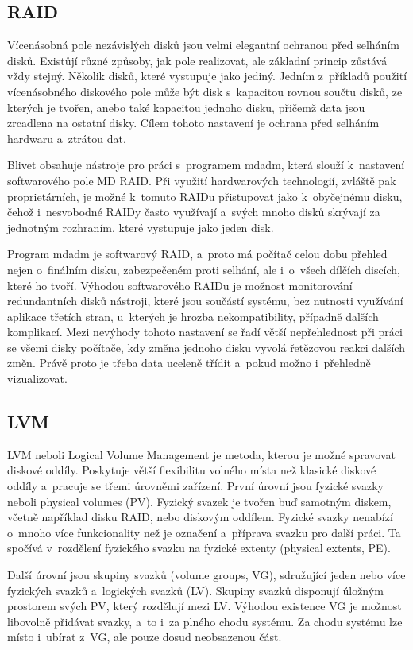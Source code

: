 \documentclass[color,table,oneside,nolot,nolof]{fithesis}
\begin{document}
\subsection{RAID}
	Vícenásobná pole nezávislých disků jsou velmi elegantní ochranou před selháním disků. Existůjí různé způsoby, jak pole realizovat, ale základní princip zůstává vždy stejný. 
	Několik disků, které vystupuje jako jediný\cite{RAID}. Jedním z~příkladů použití vícenásobného diskového pole může být disk s~kapacitou rovnou součtu disků, ze kterých je tvořen, anebo také
	kapacitou jednoho disku, přičemž data jsou zrcadlena na ostatní disky. Cílem tohoto nastavení je ochrana před selháním hardwaru a~ztrátou dat. 
	
	Blivet obsahuje nástroje pro práci s~programem mdadm, která slouží k~nastavení softwarového pole MD RAID. Při využití hardwarových technologií, zvláště pak proprietárních,
	je možné k~tomuto RAIDu přistupovat jako k~obyčejnému disku, čehož i~nesvobodné RAIDy často využívají a~svých mnoho disků skrývají za jednotným rozhraním, které vystupuje jako jeden
	disk. 

	Program mdadm je softwarový RAID, a~proto má počítač celou dobu přehled nejen o~finálním disku, zabezpečeném proti selhání, ale i~o~všech dílčích discích, které ho tvoří. Výhodou
	softwarového RAIDu je
	možnost monitorování redundantních disků nástroji, které jsou součástí systému, bez nutnosti využívání aplikace třetích stran, u~kterých je hrozba nekompatibility, případně dalších 
	komplikací.
	Mezi nevýhody tohoto nastavení se řadí větší nepřehlednost při práci se všemi disky počítače, kdy změna jednoho disku vyvolá řetězovou reakci dalších změn. Právě proto je třeba data uceleně třídit
	a~pokud možno i~přehledně vizualizovat.

\subsection{LVM}
  LVM neboli Logical Volume Management je metoda, kterou je možné spravovat diskové oddíly. Poskytuje větší flexibilitu volného místa než klasické diskové oddíly a~pracuje se třemi
	úrovněmi
	zařízení\cite{LVM}. První úrovní jsou fyzické svazky neboli physical volumes (PV). Fyzický svazek je tvořen buď samotným diskem, včetně například disku RAID, nebo diskovým oddílem. 
	Fyzické
	svazky nenabízí o~mnoho více funkcionality než je označení a~příprava svazku pro další práci. Ta spočívá v~rozdělení fyzického svazku na fyzické extenty (physical extents, PE).

	Další úrovní jsou skupiny svazků (volume groups, VG), sdružující jeden nebo více fyzických svazků a~logických svazků (LV). Skupiny svazků disponují úložným prostorem svých PV, 
	který rozdělují mezi LV. Výhodou existence VG je možnost libovolně přidávat svazky, a~to i~za plného chodu systému. Za chodu systému lze místo i~ubírat z~VG, ale 
	pouze dosud neobsazenou část. 
\end{document}
